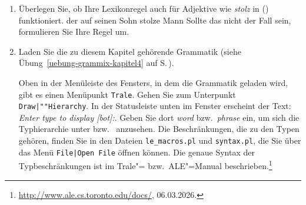 {\begin{enumerate}
\item Überlegen Sie, ob Ihre Lexikonregel auch für Adjektive wie \emph{stolz} in ()
  funktioniert.
\ea
der auf seinen Sohn stolze Mann
\z
Sollte das nicht der Fall sein, formulieren Sie Ihre Regel um.

\item Laden Sie die zu diesem Kapitel gehörende Grammatik 
(siehe Übung~\ref{uebung-grammix-kapitel4} auf S.\,\pageref{uebung-grammix-kapitel4}).

Oben in der Menüleiste des Fensters, in dem die Grammatik geladen wird, gibt es einen Menüpunkt \texttt{Trale}.
Gehen Sie zum  Unterpunkt \texttt{Draw|""Hierarchy}. 
In der Statusleiste unten im Fenster erscheint der Text: \emph{Enter type to display [bot]:}.
Geben Sie dort \emph{word} bzw.\ \emph{phrase} ein, um sich die Typhierarchie unter
 bzw.\  anzusehen. Die Beschränkungen, die zu den Typen gehören, finden
Sie in den Dateien \texttt{le\_macros.pl} und \texttt{syntax.pl}, die Sie über das Menü \texttt{File|Open File} öffnen können.
Die genaue Syntax der Typbeschränkungen ist im Trale"= bzw.\ ALE"=Manual beschrieben.\footnote{
\url{http://www.ale.cs.toronto.edu/docs/}, 06.03.2026.%
}
\end{enumerate}
}




